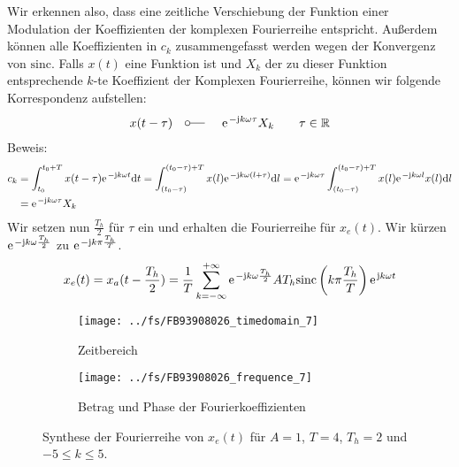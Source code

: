 \documentclass[11pt,a4paper,DIV=12]{scrartcl}
\newcommand{\diff}{\mathrm{d}}
\newcommand{\sinc}{\mathrm{sinc}}
\begin{document}
%
%
Wir erkennen also, dass eine zeitliche Verschiebung der Funktion einer
Modulation der Koeffizienten der komplexen Fourierreihe entspricht.
%
Außerdem können alle Koeffizienten in $c_k$ zusammengefasst werden
wegen der Konvergenz von $\sinc$.
%
Falls $x(t)$ eine Funktion ist und $X_k$ der zu dieser Funktion entsprechende
$k$-te Koeffizient der Komplexen Fourierreihe, können wir folgende
Korrespondenz aufstellen:
%
%
\begin{align}
	x(t-\tau)\quad\fourier\quad\e^{-\im k \omega \tau}X_k\quad\quad\tau\in\mathbb{R}
\end{align}
%
%
Beweis:
%
%
\begin{align}
	c_k&=\int_{t_0}^{t_0+T}x(t-\tau)\e^{-\im k \omega t}\diff t
	=\int_{(t_0-\tau)}^{(t_0-\tau)+T}x(l)\e^{-\im k \omega (l+\tau)}\diff l
	= \e^{-\im k \omega \tau}\int_{(t_0-\tau)}^{(t_0-\tau)+T}x(l)\e^{-\im k \omega l}x(l)\diff l\nonumber \\
	&=\e^{-\im k \omega \tau}X_k
\end{align}
%
%
Wir setzen nun $\frac{T_h}{2}$ für $\tau$ ein und erhalten die Fourierreihe für
$x_{e}(t)$.
%
Wir kürzen $\e^{-\im k \omega \frac{T_h}{2}}$ zu $\e^{-\im k \pi
\frac{T_h}{T}}$.
%
%
\begin{align}
	x_{e}(t)=x_a(t-\frac{T_h}{2})
	=\frac{1}{T}\sum_{k=-\infty}^{+\infty}\e^{-\im k\omega \frac{T_h}{2}}AT_h\sinc\left(k\pi\frac{T_h}{T}\right)\e^{\im k \omega t}
\end{align}
%
\begin{figure}
	\centering
	\begin{subfigure}{\textwidth}
		\texttt{[image: ../fs/FB93908026\_timedomain\_7]}
		\caption{Zeitbereich}
	\end{subfigure}
	\begin{subfigure}{\textwidth}
		\texttt{[image: ../fs/FB93908026\_frequence\_7]}
		\caption{Betrag und Phase der Fourierkoeffizienten}
	\end{subfigure}
	\caption{Synthese der Fourierreihe von $x_e(t)$ für $A=1$, $T=4$, $T_h=2$ und
		$-5\leq k\leq5$.}
\end{figure}
\newpage
\end{document}

